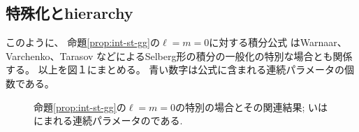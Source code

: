 \subsection{特殊化とhierarchy}
このように、
	命題\ref{prop:int-st-gg}の$\ell = m = 0$に対する積分公式
	はWarnaar、Varchenko、Tarasov などによるSelberg形の積分の一般化の特別な場合とも関係する。
	以上を図１にまとめる。
	{青}い{数字}は{公式}に{含}まれる連続パラメータの{個数}である。
			\begin{figure*}[h]
				\centering
				\begin{tikzpicture}
				
				\end{tikzpicture}
				\caption{
					命題\ref{prop:int-st-gg}の$\ell=m=0$の特別の場合とその関連結果;
いはにまれる連続パラメータのである.
				}
				\label{fig:intdep}
			\end{figure*}
